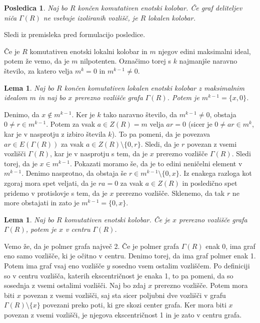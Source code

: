 \documentclass[a4paper, 12pt]{amsart}
\theoremstyle{definition} %
\theoremstyle{plain} %
\newtheorem{lema}[definicija]{Lema}
\newtheorem{posledica}[definicija]{Posledica}
\begin{document}
\begin{posledica}
Naj bo $R$ končen komutativen enotski kolobar. Če graf deliteljev niča $\Gamma(R)$ ne vsebuje izoliranih vozlišč, je $R$ lokalen kolobar.
\end{posledica}

\proof
Sledi iz premisleka pred formulacijo posledice.
\endproof

Če je $R$ komutativen enotski lokalni kolobar in $m$ njegov edini maksimalni ideal, potem že vemo, da je $m$ nilpotenten. Označimo torej s $k$ najmanjše naravno število, za katero velja $m^k = 0$ in $m^{k-1}\neq 0$.

\begin{lema}
\label{localRingCutVertex}
Naj bo $R$ končen komutativen lokalen enotski kolobar z maksimalnim idealom $m$ in naj bo $x$ prerezno vozlišče grafa $\Gamma(R)$. Potem je $m^{k-1} = \{x,0\}$.
\end{lema}

\proof
Denimo, da $x\notin m^{k-1}$. Ker je $k$ tako naravno število, da $m^{k-1} \neq 0$, obstaja $0\neq r \in m^{k-1}$. Potem za vsak $a\in Z(R)=m$ velja $ar = 0 $ (sicer je $0\neq ar \in m^k$, kar je v nasprotju z izbiro števila $k$). To pa pomeni, da je povezava $ar \in E(\Gamma(R))$ za vsak $a\in Z(R)\setminus \{0,r\}$. Sledi, da je $r$ povezan z vsemi vozlišči $\Gamma(R)$, kar je v nasprotju s tem, da je $x$ prerezno vozlišče $\Gamma(R)$. Sledi torej, da je $x\in m^{k-1}$. Pokazati moramo še, da je to edini neničelni element v $m^{k-1}$. Denimo nasprotno, da obstaja še $r\in m^{k-1} \setminus \{0,x\}$. Iz enakega razloga kot zgoraj mora spet veljati, da je $ra = 0$ za vsak $a\in Z(R)$ in posledično spet pridemo v protislovje s tem, da je $x$ prerezno vozlišče. Sklenemo, da tak $r$ ne more obstajati in zato je $m^{k-1} = \{0,x\}$.
\endproof

\begin{lema}
Naj bo $R$ komutativen enotski kolobar. Če je $x$ prerezno vozlišče grafa $\Gamma(R)$, potem  je $x$ v centru $\Gamma(R)$.
\end{lema}

\proof
Vemo že, da je polmer grafa največ 2.
Če je polmer grafa $\Gamma(R)$ enak 0, ima graf eno samo vozlišče, ki je očitno v centru. Denimo torej, da ima graf polmer enak 1. Potem ima graf vsaj eno vozlišče $y$ sosedno vsem ostalim vozliščem. Po definiciji so v centru vozlišča, katerih ekscentričnost je enaka 1, to pa pomeni, da so sosednja z vsemi ostalimi vozlišči. Naj bo zdaj $x$ prerezno vozlišče. Potem mora biti $x$ povezan z vsemi vozlišči, saj sta sicer poljubni dve vozlišči v grafu $\Gamma(R)\setminus \{x\}$ povezani preko poti, ki gre skozi center grafa. Ker mora biti $x$ povezan z vsemi vozlišči, je njegova ekscentričnost 1 in je zato v centru grafa.
\end{document}
